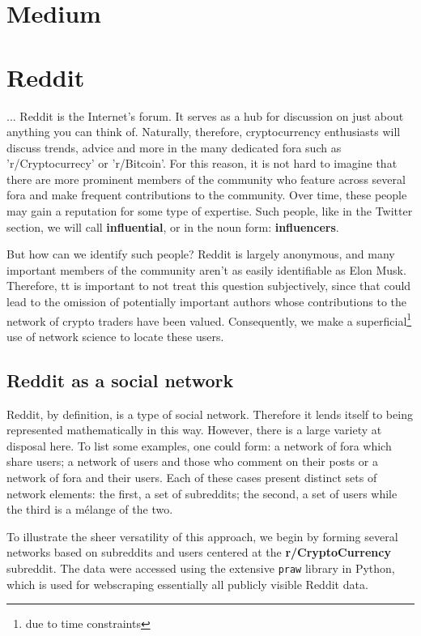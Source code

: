 \documentclass[twoside]{report}
\newcommand{\code}{\texttt}
\begin{document}
\begin{spacing}{1}
\section{Medium}
\section{Reddit}
...
Reddit is the Internet's forum. It serves as a hub for discussion on just about anything you can think of. Naturally, therefore, cryptocurrency enthusiasts will discuss trends, advice and more in the many dedicated fora such as 'r/Cryptocurrecy' or 'r/Bitcoin'. For this reason, it is not hard to imagine that there are more prominent members of the community who feature across several fora and make frequent contributions to the community. Over time, these people may gain a reputation for some type of expertise. Such people, like in the Twitter section, we will call \textbf{influential}, or in the noun form: \textbf{influencers}. 

But how can we identify such people? Reddit is largely anonymous, and many important members of the community aren't as easily identifiable as Elon Musk. Therefore, tt is important to not treat this question subjectively, since that could lead to the omission of potentially important authors whose contributions to the network of crypto traders have been valued. Consequently, we make a superficial\footnote{due to time constraints} use of network science to locate these users. 
\subsection{Reddit as a social network}\label{sec:redditSN}
Reddit, by definition, is a type of social network. Therefore it lends itself to being represented mathematically in this way. However, there is a large variety at disposal here. To list some examples, one could form: a network of fora which share users; a network of users and those who comment on their posts or a network of fora and their users. Each of these cases present distinct sets of network elements: the first, a set of subreddits; the second, a set of users while the third is a mélange of the two. 

To illustrate the sheer versatility of this approach, we begin by forming several networks based on subreddits and users centered at the \textbf{r/CryptoCurrency} subreddit. The data were accessed using the extensive \code{praw} library in Python, which is used for webscraping essentially all publicly visible Reddit data. 


\end{spacing}
\end{document}
